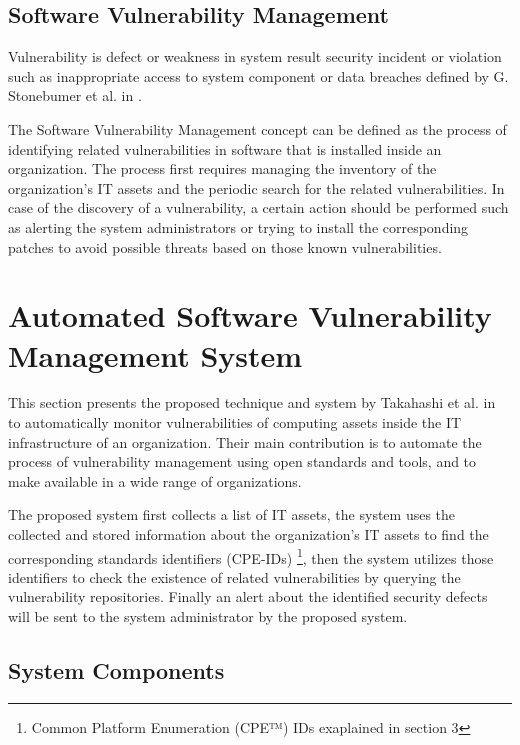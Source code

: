 \documentclass{llncs}
\begin{document}
         
\subsection{Software Vulnerability Management}

\par Vulnerability is defect or weakness in system result security incident or violation such as inappropriate access to system component or data breaches defined by G. Stonebumer et al. in \cite{vuln}.  

\par The Software Vulnerability Management concept can be defined as the process of identifying related vulnerabilities in software that is installed inside an organization. The process first requires managing the inventory of the organization's IT assets and the periodic search for the related vulnerabilities. In case of the discovery of a vulnerability, a certain action should be performed such as alerting the system administrators or trying to install the corresponding patches to avoid possible threats based on those known vulnerabilities. 



   
\section{Automated Software Vulnerability Management System}

\par This section presents the proposed technique and system by Takahashi et al. in \cite{paper1} to automatically monitor vulnerabilities of computing assets inside the IT infrastructure of an organization. Their main contribution is to automate the process of vulnerability management using open standards and tools, and to make available in a wide range of organizations.
\par
 The proposed system first collects a list of IT assets, the system uses the collected and stored information about the organization's IT assets to find the corresponding standards identifiers (CPE-IDs) \footnote{ Common Platform Enumeration (CPE™) IDs exaplained in section 3}, then the system utilizes those identifiers to check the existence of related vulnerabilities by querying the vulnerability repositories. Finally an alert about the identified security defects will be sent to the system administrator by the proposed system.
    
\subsection{System Components}
\end{document}
